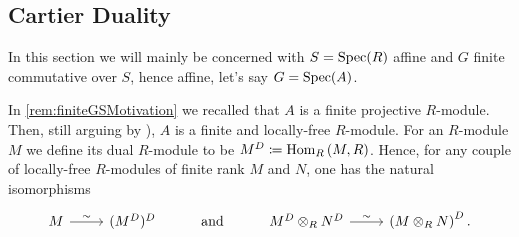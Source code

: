 \subsection{Cartier Duality}\label{CartierDualityGroups}
In this section we will mainly be concerned with $S = \operatorname{Spec}(R)$ affine
and $G$ finite commutative over $S$, hence affine, let's say $G = \operatorname{Spec}(A)$.


\begin{rem}[]
	In \cref{rem:finiteGSMotivation} we recalled that $A$ is a finite projective $R$-module.
	Then, still arguing by
	\cite[\href{https://stacks.math.columbia.edu/tag/00NX}{Lemma 00NX}]{SP}),
	$A$ is a finite and locally-free $R$-module.
	For an $R$-module $M$ we define its dual $R$-module to be
	$M^D \coloneqq \operatorname{Hom}_{R} \left( M, R \right)$.
	Hence, for any couple of locally-free $R$-modules of finite 
	rank $M$ and $N$, one has the natural isomorphisms
	\begin{equation*}%
	\begin{tikzcd}
		M \arrow[r, "\sim", rightarrow] &
		(M^D)^D &
		\text{and} &
		M^D \otimes_R N^D \arrow[r, "\sim", rightarrow] &
		\left( M \otimes_R N \right)^D
	.\end{tikzcd}
	\end{equation*}
\end{rem}


